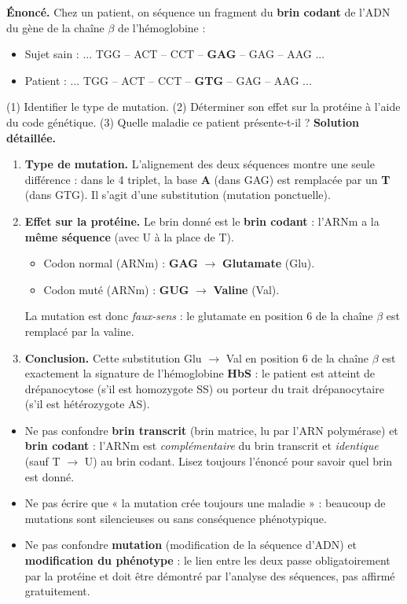\documentclass[11pt]{article}
\newcommand{\cle}[1]{{\popxbold\color{popdark}#1}}
\begin{document}
\begin{exoresolu}
\textbf{Énoncé.} Chez un patient, on séquence un fragment du \textbf{brin codant} de l'ADN du gène de la chaîne $\beta$ de l'hémoglobine :
\begin{itemize}
\item Sujet sain : ... TGG -- ACT -- CCT -- \textbf{GAG} -- GAG -- AAG ...
\item Patient : \quad\; ... TGG -- ACT -- CCT -- \textbf{GTG} -- GAG -- AAG ...
\end{itemize}
(1) Identifier le type de mutation. (2) Déterminer son effet sur la protéine à l'aide du code génétique. (3) Quelle maladie ce patient présente-t-il ?
\tcblower
\textbf{Solution détaillée.}
\begin{enumerate}
\item \textbf{Type de mutation.} L'alignement des deux séquences montre une seule différence : dans le 4\ieme{} triplet, la base \textbf{A} (dans GAG) est remplacée par un \textbf{T} (dans GTG). Il s'agit d'une \cle{substitution} (mutation ponctuelle).
\item \textbf{Effet sur la protéine.} Le brin donné est le \textbf{brin codant} : l'ARNm a la \textbf{même séquence} (avec U à la place de T).
      \begin{itemize}
      \item Codon normal (ARNm) : \textbf{GAG} $\rightarrow$ \textbf{Glutamate} (Glu).
      \item Codon muté (ARNm) : \textbf{GUG} $\rightarrow$ \textbf{Valine} (Val).
      \end{itemize}
      La mutation est donc \emph{faux-sens} : le glutamate en position 6 de la chaîne $\beta$ est remplacé par la valine.
\item \textbf{Conclusion.} Cette substitution Glu $\rightarrow$ Val en position 6 de la chaîne $\beta$ est exactement la signature de l'hémoglobine \textbf{HbS} : le patient est atteint de \cle{drépanocytose} (s'il est homozygote SS) ou porteur du trait drépanocytaire (s'il est hétérozygote AS).
\end{enumerate}
\end{exoresolu}

\begin{attention}
\begin{itemize}
\item Ne pas confondre \textbf{brin transcrit} (brin matrice, lu par l'ARN polymérase) et \textbf{brin codant} : l'ARNm est \emph{complémentaire} du brin transcrit et \emph{identique} (sauf T $\rightarrow$ U) au brin codant. Lisez toujours l'énoncé pour savoir quel brin est donné.
\item Ne pas écrire que « la mutation crée toujours une maladie » : beaucoup de mutations sont silencieuses ou sans conséquence phénotypique.
\item Ne pas confondre \textbf{mutation} (modification de la séquence d'ADN) et \textbf{modification du phénotype} : le lien entre les deux passe obligatoirement par la protéine et doit être démontré par l'analyse des séquences, pas affirmé gratuitement.
\end{itemize}
\end{attention}
\end{document}
